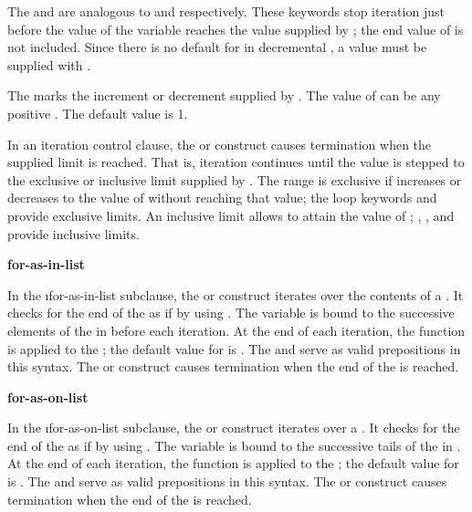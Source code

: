 The   and  are analogous to
 and  respectively.  These keywords stop
iteration just before the value of the variable  reaches the value 
supplied by ; the end value of  is not included.
Since there is no default for  in decremental ,
a value must be supplied with .
 
 
The   marks the increment or decrement supplied by
.  The value of  can be any 
positive 
.
The default value is 1.
 
\endlist
 
In an iteration control clause, the  or  construct
causes termination when the supplied limit is reached.  That is,
iteration continues until the value  is stepped to the
exclusive or inclusive limit supplied by .  The range is
exclusive if  increases or decreases 
to the value of  without reaching that value; the loop
keywords  and  provide exclusive limits.  An
inclusive limit allows  to attain the value of
; , , and  provide inclusive
limits.  



{\bf for-as-in-list}

In the \i{for-as-in-list} subclause,
the  
or  construct iterates over the contents of a 
.  It checks for 
the end of the  as if by using .  
The variable  is bound to the successive elements  of 
the  in  before each
iteration.  At the end of each iteration, the function 
is applied to the ; the default value for  is
.
The   and  serve as valid prepositions in
this syntax.
The  or  construct causes termination when the
end of the  is reached.

{\bf for-as-on-list}

In the \i{for-as-on-list} subclause, the  or 
construct iterates over
a . It checks for the
end of the  as if by using .
The variable  is bound to the successive tails of the 
 in 
.  At the end of each iteration, the function 
 is applied to the ; the default value for  is .
 The   and  serve as valid
prepositions in this syntax.
The  or  construct causes termination when the
end of the  is reached.
 
